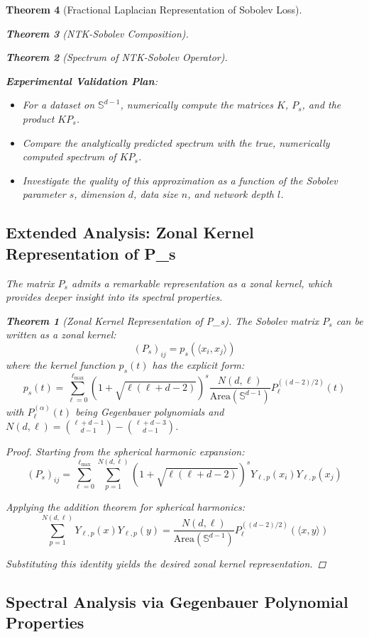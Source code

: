 \documentclass{article}
\newtheorem{theorem}{Theorem}[section]
\begin{document}
\begin{theorem}[Fractional Laplacian Representation of Sobolev Loss]
\begin{theorem}[NTK-Sobolev Composition]
\begin{theorem}[Spectrum of NTK-Sobolev Operator]
\begin{enumerate}
    \textbf{Experimental Validation Plan}:
    \begin{itemize}
        \item For a dataset on $\mathbb{S}^{d-1}$, numerically compute the matrices $K$, $P_s$, and the product $K P_s$.
        \item Compare the analytically predicted spectrum with the true, numerically computed spectrum of $K P_s$.
        \item Investigate the quality of this approximation as a function of the Sobolev parameter $s$, dimension $d$, data size $n$, and network depth $l$.
    \end{itemize}
\end{enumerate}



\subsection{Extended Analysis: Zonal Kernel Representation of P_s}

The matrix $P_s$ admits a remarkable representation as a zonal kernel, which provides deeper insight into its spectral properties.

\begin{theorem}[Zonal Kernel Representation of P_s]
The Sobolev matrix $P_s$ can be written as a zonal kernel:
\[ (P_s)_{ij} = p_s(\langle x_i, x_j \rangle) \]
where the kernel function $p_s(t)$ has the explicit form:
\[ p_s(t) = \sum_{\ell=0}^{\ell_{\max}} (1 + \sqrt{\ell(\ell + d - 2)})^s \frac{N(d,\ell)}{\text{Area}(\mathbb{S}^{d-1})} P_\ell^{((d-2)/2)}(t) \]
with $P_\ell^{(\alpha)}(t)$ being Gegenbauer polynomials and $N(d,\ell) = \binom{\ell+d-1}{d-1} - \binom{\ell+d-3}{d-1}$.
\end{theorem}

\begin{proof}
Starting from the spherical harmonic expansion:
\[ (P_s)_{ij} = \sum_{\ell=0}^{\ell_{\max}} \sum_{p=1}^{N(d,\ell)} (1 + \sqrt{\ell(\ell + d - 2)})^s Y_{\ell,p}(x_i) Y_{\ell,p}(x_j) \]

Applying the addition theorem for spherical harmonics:
\[ \sum_{p=1}^{N(d,\ell)} Y_{\ell,p}(x) Y_{\ell,p}(y) = \frac{N(d,\ell)}{\text{Area}(\mathbb{S}^{d-1})} P_\ell^{((d-2)/2)}(\langle x, y \rangle) \]

Substituting this identity yields the desired zonal kernel representation.
\end{proof}

\subsection{Spectral Analysis via Gegenbauer Polynomial Properties}


\end{theorem}
\end{theorem}
\end{theorem}
\end{document}
